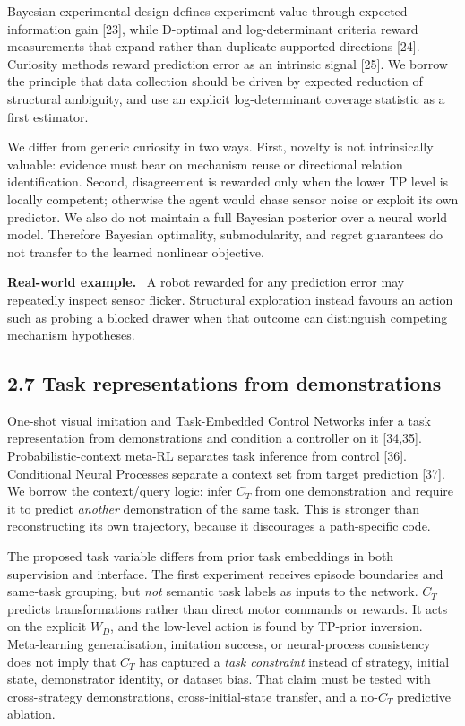 \documentclass[11pt]{article}
\newenvironment{example}{%
  \par\smallskip\noindent\begin{minipage}{\textwidth}%
  \color{teal!60!black}\small
  \textbf{\color{teal!70!black}Real-world example.}\
}{%
  \end{minipage}\par\smallskip}
\begin{document}
Bayesian experimental design defines experiment value through expected information gain [23], while D-optimal and log-determinant
criteria reward measurements that expand rather than duplicate supported directions [24]. Curiosity methods reward prediction error
as an intrinsic signal [25]. We borrow the principle that data collection should be driven by expected reduction of structural
ambiguity, and use an explicit log-determinant coverage statistic as a first estimator.

We differ from generic curiosity in two ways. First, novelty is not intrinsically valuable: evidence must bear on mechanism reuse
or directional relation identification. Second, disagreement is rewarded only when the lower TP level is locally competent;
otherwise the agent would chase sensor noise or exploit its own predictor. We also do not maintain a full Bayesian posterior over a
neural world model. Therefore Bayesian optimality, submodularity, and regret guarantees do not transfer to the learned nonlinear
objective.

\begin{example}
A robot rewarded for any prediction error may repeatedly inspect sensor flicker. Structural exploration instead favours an action
such as probing a blocked drawer when that outcome can distinguish competing mechanism hypotheses.
\end{example}

\subsection*{2.7 Task representations from demonstrations}

One-shot visual imitation and Task-Embedded Control Networks infer a task representation from demonstrations and condition a
controller on it [34,35]. Probabilistic-context meta-RL separates task inference from control [36]. Conditional Neural Processes
separate a context set from target prediction [37]. We borrow the context/query logic: infer $C_T$ from one demonstration and
require it to predict \emph{another} demonstration of the same task. This is stronger than reconstructing its own trajectory,
because it discourages a path-specific code.

The proposed task variable differs from prior task embeddings in both supervision and interface. The first experiment receives
episode boundaries and same-task grouping, but \emph{not} semantic task labels as inputs to the network. $C_T$ predicts
transformations rather than direct motor commands or rewards. It acts on the explicit $W_D$, and the low-level action is found by
TP-prior inversion. Meta-learning generalisation, imitation success, or neural-process consistency does not imply that $C_T$ has
captured a \emph{task constraint} instead of strategy, initial state, demonstrator identity, or dataset bias. That claim must be
tested with cross-strategy demonstrations, cross-initial-state transfer, and a no-$C_T$ predictive ablation.
\end{document}
